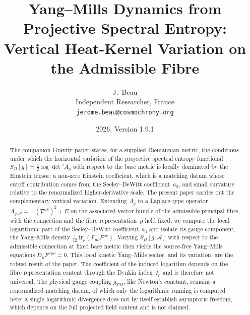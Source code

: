 \documentclass[12pt,a4paper]{article}
\theoremstyle{remark}
\theoremstyle{plain}
\theoremstyle{definition}
\begin{document}
  \title{Yang--Mills Dynamics from Projective Spectral Entropy:\\
  Vertical Heat-Kernel Variation on the Admissible Fibre}

  \author{J.~Beau\\
  \small Independent Researcher, France\\
  \small \texttt{jerome.beau@cosmochrony.org}}

  \date{2026, Version 1.9.1}

  \maketitle

  \begin{abstract}
    The companion Gravity paper states, for a supplied Riemannian metric, the conditions under which the
    horizontal variation of the projective spectral entropy functional
    $S_\Pi[g] = \tfrac{1}{2}\log\det' A_g$ with respect to the base
    metric is locally dominated by the Einstein tensor: a non-zero Einstein coefficient, which is a matching datum whose
    cutoff contribution comes from the Seeley--DeWitt coefficient~$a_2$, and small curvature relative to the
    renormalized higher-derivative scale.
    The present paper carries out the complementary vertical variation.
    Extending $A_g$ to a Laplace-type operator
    $A_{g,\mathcal{A}} = -(\nabla^{\mathcal{A}})^2 + E$
    on the associated vector bundle of the admissible principal fibre,
    with the connection and the fibre representation~$\rho$ held fixed,
    we compute the local logarithmic part of the Seeley--DeWitt
    coefficient~$a_4$ and isolate its gauge component, the Yang--Mills
    density $\tfrac{1}{12}\,\mathrm{tr}_\rho(F_{\mu\nu}F^{\mu\nu})$.
    Varying $S_\Pi[g, \mathcal{A}]$ with respect to the admissible
    connection at fixed base metric then yields the source-free
    Yang--Mills equations $D_\mu F^{a\mu\nu} = 0$.
    This local kinetic Yang--Mills sector, and its variation, are the
    robust result of the paper.
    The coefficient of the induced logarithm depends on the fibre
    representation content through the Dynkin index~$I_\rho$ and is
    therefore not universal.
    The physical gauge coupling $g_{\mathrm{YM}}$, like Newton's
    constant, remains a renormalized matching datum, of which only the
    logarithmic running is computed here; a single logarithmic
    divergence does not by itself establish asymptotic freedom, which
    depends on the full projected field content and is not claimed.

\end{abstract}
\end{document}
